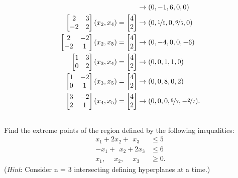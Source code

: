 \documentclass[12pt]{amsart}
\begin{document}
\begin{align*}
		&\rightarrow (0, -1 ,6 ,0 ,0 ) \\
	\begin{bmatrix}
		2 & 3 \\
		-2 & 2
	\end{bmatrix}  (x_2 , x_4 ) =\begin{bmatrix} 4 \\ 2 \end{bmatrix}
		&\rightarrow (0, \nicefrac{1}{5} ,0, \nicefrac{6}{5} ,0 ) \\
	\begin{bmatrix}
		2 & -2 \\
		-2 &  1
	\end{bmatrix}  (x_2 , x_5 ) =\begin{bmatrix} 4 \\ 2 \end{bmatrix}
		&\rightarrow (0, -4 ,0,0, -6 ) \\
	\begin{bmatrix}
		1 & 3  \\
		0 & 2 
	\end{bmatrix}  (x_3 , x_4 ) =  \begin{bmatrix} 4 \\ 2 \end{bmatrix}
		&\rightarrow (0,0, 1 , 1 ,0) \\
	\begin{bmatrix}
		1 & -2 \\
		0 &  1
	\end{bmatrix}  (x_3 , x_5 ) =  \begin{bmatrix} 4 \\ 2 \end{bmatrix}
		&\rightarrow (0,0, 8 ,0, 2 ) \\
	\begin{bmatrix}
		3 & -2 \\
		2 &  1
	\end{bmatrix}  (x_4 , x_5 ) =  \begin{bmatrix} 4 \\ 2 \end{bmatrix}
		&\rightarrow (0,0,0, \nicefrac{8}{7} , -\nicefrac{2}{7} ) .
\end{align*}

\clearpage
\setcounter{subsection}{39}
\subsection{}
Find the extreme points of the region defined by the following
inequalities:
\begin{align*}
	  x_1 + 2x_2 + \,\ x_3 &\leq 5 \\
	- x_1 + \,\ x_2 + 2x_3 &\leq 6 \\
	  x_1, \quad\ x_2, \quad\ x_3 &\geq 0.
\end{align*}
(\textit{Hint}: Consider n = 3 intersecting defining hyperplanes at a time.)
\end{document}

